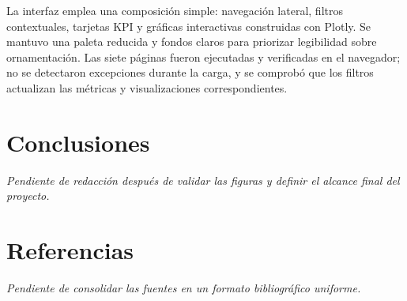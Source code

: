 \documentclass[12pt]{article}
\begin{document}
La interfaz emplea una composición simple: navegación lateral, filtros contextuales, tarjetas KPI y gráficas interactivas construidas con Plotly. Se mantuvo una paleta reducida y fondos claros para priorizar legibilidad sobre ornamentación. Las siete páginas fueron ejecutadas y verificadas en el navegador; no se detectaron excepciones durante la carga, y se comprobó que los filtros actualizan las métricas y visualizaciones correspondientes.

\section*{Conclusiones}

\textit{Pendiente de redacción después de validar las figuras y definir el alcance final del proyecto.}

\section*{Referencias}

\textit{Pendiente de consolidar las fuentes en un formato bibliográfico uniforme.}
\end{document}
